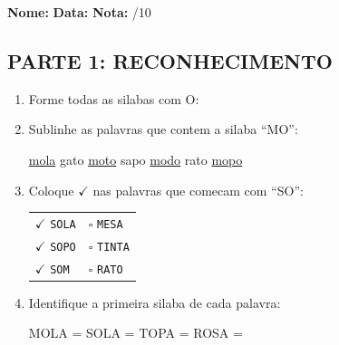 \begin{exercicio}
\noindent\textbf{Nome:} \underline{\hspace{3.2cm}} \quad \textbf{Data:} \underline{\hspace{1.6cm}} \quad \textbf{Nota:} \underline{\hspace{0.9cm}}/10

\subsection*{PARTE 1: RECONHECIMENTO}

\begin{enumerate}
  \item Forme todas as silabas com O:
  \begin{center}
  \end{center}

  \item Sublinhe as palavras que contem a silaba ``MO'':
  \begin{center}
  \uline{mola} \quad gato \quad \uline{moto} \quad sapo \quad \uline{modo} \quad rato \quad \uline{mopo}
  \end{center}

  \item Coloque $\checkmark$ nas palavras que comecam com ``SO'':
  \begin{center}
  \begin{tabular}{ll}
  $\checkmark$ \texttt{SOLA} & $\square$ \texttt{MESA} \\
  $\checkmark$ \texttt{SOPO} & $\square$ \texttt{TINTA} \\
  $\checkmark$ \texttt{SOM} & $\square$ \texttt{RATO}
  \end{tabular}
  \end{center}

  \item Identifique a primeira silaba de cada palavra:
  \begin{center}
  MOLA = \underline{\hspace{1cm}} \quad SOLA = \underline{\hspace{1cm}} \quad TOPA = \underline{\hspace{1cm}} \quad ROSA = \underline{\hspace{1cm}}
  \end{center}


\end{enumerate}
\end{exercicio}
